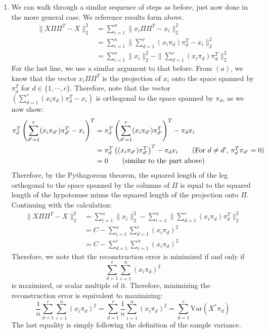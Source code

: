 \documentclass{harvardml}
\theoremstyle{plain}
\begin{document}
\begin{enumerate}[label=(\alph*)]
\item We can walk through a similar sequence of steps as before, just now done in the more general case. We reference results form above.
\begin{align*}
\| X \Pi \Pi^T - X \|_2^2 &= \sum_{i=1}^n \|x_i\Pi\Pi^T - x_i \|_2^2 \\
&= \sum_{i=1}^n \|\sum_{d=1}^r (x_i\pi_d)\pi_d^T - x_i\|_2^2  \tag{using results from (a)}\\
&= \sum_{i=1}^n \|x_i \|_2^2 - \|\sum_{d=1}^r (x_i \pi_d)\pi_d^T \|_2^2
\end{align*}
For the last line, we use a similar argument to that before. From $(a)$, we know that the vector $x_i\Pi\Pi^T$ is the projection of $x_i$ onto the space spanned by $\pi_d^T$ for $d \in \{1,\cdots,r\}$. Therefore, note that the vector $(\sum_{d=1}^r (x_i\pi_d)\pi_d^T - x_i)$ is orthogonal to the space spanned by $\pi_d$, as we now show:
\begin{align*}
\pi_d^T\left(\sum_{d'=1}^r (x_i\pi_{d'})\pi_{d'}^T - x_i \right)^T &= \pi_d^T\left(\sum_{d'=1}^r (x_i\pi_{d'})\pi_{d'}^T\right)^T - \pi_dx_i \\
&= \pi_d^T \left((x_i\pi_{d'})\pi_{d'}^T \right)^T - \pi_dx_i \tag{For $d \neq d'$, $\pi_d^T\pi_{d'} = 0$} \\
&= 0 \tag{similar to the part above}
\end{align*}
Therefore, by the Pythagorean theorem, the squared length of the leg orthogonal to the space spanned by the columns of $\Pi$ is equal to the squared length of the hypotenuse minus the squared length of the projection onto $\Pi$. Continuing with the calculation:
\begin{align*}
\| X \Pi \Pi^T - X \|_2^2 &=  \sum_{i=1}^n \|x_i \|_2^2 - \sum_{i=1}^n \|\sum_{d=1}^r (x_i \pi_d)\pi_d^T \|_2^2\\
&= C -\sum_{i=1}^n \sum_{d=1}^r (x_i \pi_d)^2 \tag{the $\pi_d$ are orthogonal and unit length} \\
&= C - \sum_{d=1}^r \sum_{i=1}^n (x_i \pi_d)^2
\end{align*}
Therefore, we note that the reconstruction error is minimized if and only if
$$
\sum_{d=1}^r \sum_{i=1}^n (x_i \pi_d)^2
$$
is maximized, or scalar multiple of it. Therefore, minimizing the reconstruction error is equivalent to maximizing:
$$
\frac{1}{n}\sum_{d=1}^r \sum_{i=1}^n (x_i \pi_d)^2 = \sum_{d=1}^r \frac{1}{n} \sum_{i=1}^n (x_i \pi_d)^2 = \sum_{d=1}^r \text{Var}(X^*\pi_d)
$$
The last equality is simply following the definition of the sample variance.
\end{enumerate}
\end{document}
